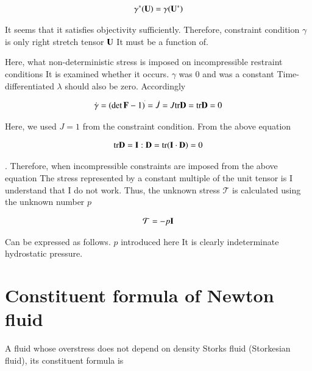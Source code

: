 \begin{eqnarray}
\gamma^*({\mathbf{U}})=\gamma({\mathbf{U}}^*)
\end{eqnarray}

It seems that it satisfies objectivity sufficiently.
Therefore, constraint condition $\gamma$ is only right stretch tensor $\mathbf{U}$
It must be a function of.

Here, what non-deterministic stress is imposed on incompressible restraint conditions
It is examined whether it occurs. $\gamma$ was 0 and was a constant
Time-differentiated $\lambda$ should also be zero. Accordingly

\begin{eqnarray}
\dot{\gamma}
=  (\det{\mathbf{F}}-1)^{\dot{}}
=  \dot{J}
=  J\mathrm{tr}{\mathbf{D}}
=  \mathrm{tr}{\mathbf{D}}
=  0
\end{eqnarray}

Here, we used $J=1$ from the constraint condition. From the above equation

\begin{eqnarray}
\mathrm{tr}{\mathbf{D}}={\mathbf{I}}:{\mathbf{D}}=\mathrm{tr}({\mathbf{I}}\cdot{\mathbf{D}})=0
\end{eqnarray}

. Therefore, when incompressible constraints are imposed from the above equation
The stress represented by a constant multiple of the unit tensor is
I understand that I do not work.
Thus, the unknown stress $\mathcal{T}$ is calculated using the unknown number $p$

\begin{eqnarray}
\mathcal{T}=-p{\mathbf{I}}
\end{eqnarray}

Can be expressed as follows. $p$ introduced here
It is clearly indeterminate hydrostatic pressure.




\section{Constituent formula of Newton fluid}

A fluid whose overstress does not depend on density
Storks fluid (Storkesian fluid), its constituent formula is

